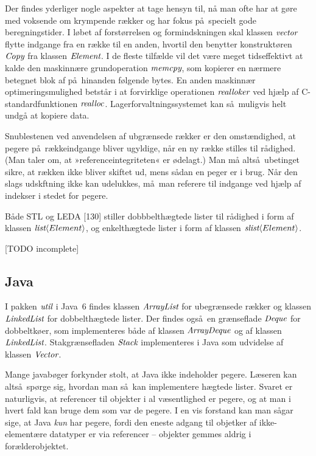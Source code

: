 Der findes yderliger nogle aspekter at tage hensyn til, nå man ofte har at gøre med voksende om krympende rækker og har fokus på specielt gode beregningstider.
I løbet af forstørrelsen og formindskningen skal klassen $\operatorname{\emph{vector}}$ flytte indgange fra en række til en anden, hvortil den benytter konstruktøren $\operatorname{\emph{Copy}}$ fra klassen $\operatorname{\emph{Element}}$.
I de fleste tilfælde vil det være meget tidseffektivt at kalde den maskinnære grundoperation $\operatorname{\emph{memcpy}}$, som kopierer en nærmere betegnet blok af på hinanden følgende bytes.
En anden maskinnær optimeringsmulighed betstår i at forvirklige operationen $\operatorname{\emph{realloker}}$ ved hjælp af C-standardfunktionen $\operatorname{\emph{realloc}}$.
Lagerforvaltningssystemet kan så muligvis helt undgå at kopiere data.

Snublestenen ved anvendelsen af ubgrænsede rækker er den omstændighed, at pegere på rækkeindgange bliver ugyldige, når en ny række stilles til rådighed. 
(Man taler om, at »referenceintegriteten« er ødelagt.)
Man må altså ubetinget sikre, at rækken ikke bliver skiftet ud, mens sådan en peger er i brug.
Når den slags udskftning ikke kan udelukkes, må man referere til indgange ved hjælp af indekser i stedet for pegere.

Både STL og LEDA [130] stiller dobbbelthægtede lister til rådighed i form af klassen $\operatorname{\emph{list}}\langle Element\rangle$, og enkelthægtede lister i form af klassen $\operatorname{\emph{slist}}\langle Element\rangle$.

[TODO incomplete]

\subsection{Java}

I pakken $\operatorname{\emph{util}}$ i Java~6 findes klassen $\operatorname{\emph{ArrayList}}$ for ubegrænsede rækker og klassen $\operatorname{\emph{LinkedList}}$ for dobbelthægtede lister.
Der findes også en grænseflade $\operatorname{\emph{Deque}}$ for dobbeltkøer, som implementeres både af klassen $\operatorname{\emph{ArrayDeque}}$ og af klassen $\operatorname{\emph{LinkedList}}$.
Stakgrænsefladen $\operatorname{\emph{Stack}}$ implementeres i Java som udvidelse af klassen $\operatorname{\emph{Vector}}$.

Mange javabøger forkynder stolt, at Java ikke indeholder pegere.
Læseren kan altså spørge sig, hvordan man så kan implementere hægtede lister.
Svaret er naturligvis, at referencer til objekter i al væsentlighed er pegere, og at man i hvert fald kan bruge dem som var de pegere.
I en vis forstand kan man sågar sige, at Java \emph{kun} har pegere, fordi den eneste adgang til objetker af ikke-elementære datatyper er via referencer -- objekter gemmes aldrig i forælderobjektet.

